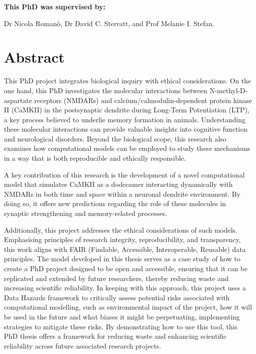 \documentclass[
  11pt,
  letterpaper,
]{scrreprt}
\begin{document}
\vspace*{\fill}
\begin{center}
    {\large\bfseries This PhD was supervised by:}

    \vspace{2ex}

    {\large Dr Nicola Romanò, Dr David C. Sterratt, and Prof Melanie I. Stefan.}
\end{center}
\vfill


\chapter*{Abstract}\label{abstract}


This PhD project integrates biological inquiry with ethical
considerations. On the one hand, this PhD investigates the molecular
interactions between N-methyl-D-aspartate receptors (NMDARs) and
calcium/calmodulin-dependent protein kinase II (CaMKII) in the
postsynaptic dendrite during Long-Term Potentiation (LTP), a key process
believed to underlie memory formation in animals. Understanding these
molecular interactions can provide valuable insights into cognitive
function and neurological disorders. Beyond the biological scope, this
research also examines how computational models can be employed to study
these mechanisms in a way that is both reproducible and ethically
responsible.

A key contribution of this research is the development of a novel
computational model that simulates CaMKII as a dodecamer interacting
dynamically with NMDARs in both time and space within a neuronal
dendrite environment. By doing so, it offers new predictions regarding
the role of these molecules in synaptic strengthening and memory-related
processes.

Additionally, this project addresses the ethical considerations of such
models. Emphasising principles of research integrity, reproducibility,
and transparency, this work aligns with FAIR (Findable, Accessible,
Interoperable, Reusable) data principles. The model developed in this
thesis serves as a case study of how to create a PhD project designed to
be open and accessible, ensuring that it can be replicated and extended
by future researchers, thereby reducing waste and increasing scientific
reliability. In keeping with this approach, this project uses a Data
Hazards framework to critically assess potential risks associated with
computational modelling, such as environmental impact of the project,
how it will be used in the future and what biases it might be
perpetuating, implementing strategies to mitigate these risks. By
demonstrating how to use this tool, this PhD thesis offers a framework
for reducing waste and enhancing scientific reliability across future
associated research projects.
\end{document}
